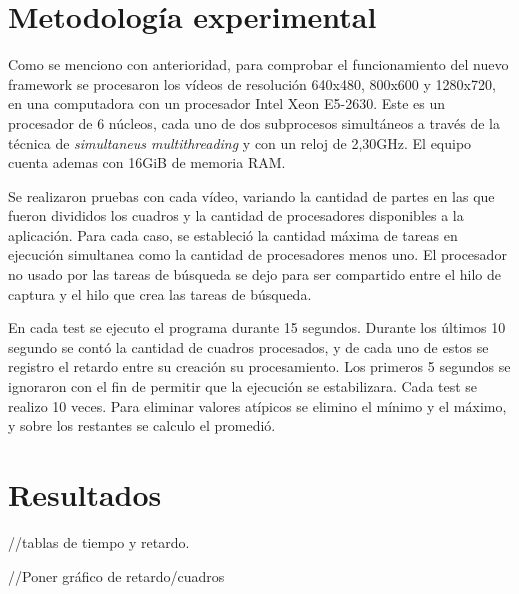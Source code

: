 
\section{Metodología experimental}

Como se menciono con anterioridad, para comprobar el funcionamiento del nuevo
framework se procesaron los vídeos de resolución 640x480, 800x600 y 1280x720, en
una computadora con un procesador Intel Xeon E5-2630. Este es un procesador de
6 núcleos, cada uno de dos subprocesos simultáneos a través de la técnica de
\emph{simultaneus multithreading} y con un reloj de 2,30GHz. El equipo cuenta
ademas con 16GiB de memoria RAM.

Se realizaron pruebas con cada vídeo, variando la cantidad de partes en las que
fueron divididos los cuadros y la cantidad de procesadores disponibles a la
aplicación. Para cada caso, se estableció la cantidad máxima de tareas en
ejecución simultanea como la cantidad de procesadores menos uno. El procesador
no usado por las tareas de búsqueda se dejo para ser compartido entre el hilo
de captura y el hilo que crea las tareas de búsqueda.

En cada test se ejecuto el programa durante 15 segundos. Durante los
últimos 10 segundo se contó la cantidad de cuadros procesados, y de cada uno de
estos se registro el retardo entre su creación su procesamiento. Los primeros 5
segundos se ignoraron con el fin de permitir que la ejecución se estabilizara.
Cada test se realizo 10 veces. Para eliminar valores atípicos se elimino el
mínimo y el máximo, y sobre los restantes se calculo el promedió.

\section{Resultados}

//tablas de tiempo y retardo.

//Poner gráfico de retardo/cuadros
